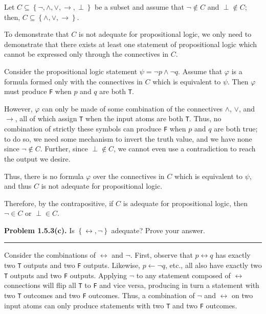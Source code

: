 \documentclass{article}
\begin{document}
Let $C \subseteq \left\{ \lnot, \wedge, \vee, \to, \perp \right\}$ be a subset
and assume that $\lnot \not\in C$ and $\perp \not\in C$; then, $C \subseteq
\left\{ \wedge, \vee, \to \right\}$.

To demonstrate that $C$ is not adequate for propositional logic, we only need
to demonstrate that there exists at least one statement of propositional logic
which cannot be expressed only through the connectives in $C$.

Consider the propositional logic statement $\psi = \lnot p \wedge \lnot q$.
Assume that $\varphi$ is a formula formed only with the connectives in $C$
which is equivalent to $\psi$. Then $\varphi$ must produce \verb|F| when
$p$ and $q$ are both \verb|T|.

However, $\varphi$ can only be made of some combination of the connectives
$\wedge$, $\vee$, and $\to$, all of which assign \verb|T| when the input atoms
are both \verb|T|. Thus, no combination of strictly these symbols can produce
\verb|F| when $p$ and $q$ are both true; to do so, we need some mechanism to
invert the truth value, and we have none since $\lnot \not\in C$. Further,
since $\perp \not\in C$, we cannot even use a contradiction to reach the output
we desire.

Thus, there is no formula $\varphi$ over the connectives in $C$ which is
equivalent to $\psi$, and thus $C$ is not adequate for propositional logic.

Therefore, by the contrapositive, if $C$ is adequate for propositional logic,
then $\lnot \in C$ or $\perp \in C$.

\newpage{}

\noindent\textbf{Problem 1.5.3(c).} Is $\left\{ \leftrightarrow, \lnot \right\}$
adequate? Prove your answer.

\vspace{0.2cm}
\hrule{}
\vspace{0.2cm}

Consider the combinations of $\leftrightarrow$ and $\lnot$. First, observe that
$p \leftrightarrow q$ has exactly two \verb|T| outputs and two \verb|F| outputs.
Likewise, $p \leftarrow \lnot q$, etc., all also have exactly two \verb|T|
outputs and two \verb|F| outputs. Applying $\lnot$ to any statement composed
of $\leftrightarrow$ connections will flip all \verb|T| to \verb|F| and vice
versa, producing in turn a statement with two \verb|T| outcomes and two
\verb|F| outcomes. Thus, a combination of $\lnot$ and $\leftrightarrow$ on
two input atoms can only produce statements with two \verb|T| and two
\verb|F| outcomes.
\end{document}
